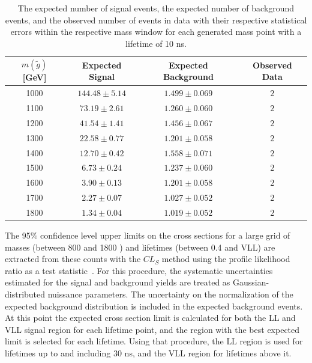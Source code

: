 \begin{table}[!htbp]
  \begin{center}
    \begin{tabular}{cccc}
      \hline
      $m(\tilde{g})$ [GeV]  & Expected Signal & Expected Background & Observed Data\\ 
      \hline
      1000    & $144.48 \pm 5.14 $ & $1.499 \pm 0.069 $ & $2$ \\
      1100    & $73.19 \pm 2.61 $  & $1.260 \pm 0.060 $ & $2$ \\
      1200    & $41.54 \pm 1.41 $  & $1.456 \pm 0.067 $ & $2$ \\
      1300    & $22.58 \pm 0.77 $  & $1.201 \pm 0.058 $ & $2$ \\
      1400    & $12.70 \pm 0.42 $  & $1.558 \pm 0.071 $ & $2$ \\
      1500    & $6.73 \pm 0.24 $   & $1.237 \pm 0.060 $ & $2$ \\
      1600    & $3.90 \pm 0.13 $   & $1.201 \pm 0.058 $ & $2$ \\
      1700    & $2.27 \pm 0.07 $   & $1.027 \pm 0.052 $ & $2$ \\
      1800    & $1.34 \pm 0.04 $   & $1.019 \pm 0.052 $ & $2$ \\
      \hline
    \end{tabular}
  \end{center}
  \caption{The expected number of signal events, the expected number of background events, and the observed number of events in data with their respective statistical errors within the respective mass window for each generated mass point with a lifetime of 10 ns.}
  \label{tab:counts_10ns}
\end{table}


The 95\% confidence level upper limits on the cross sections for a large grid of masses (between 800 and 1800 \GeV) and lifetimes (between 0.4 and \ac{VLL}) are extracted from these counts with the $CL_{S}$ method using the profile likelihood ratio as a test statistic~\cite{CLS_method}.
For this procedure, the systematic uncertainties estimated for the signal and background yields are treated as Gaussian-distributed nuissance parameters.
The uncertainty on the normalization of the expected background distribution is included in the expected background events.
At this point the expected cross section limit is calculated for both the \ac{LL} and \ac{VLL} signal region for each lifetime point, and the region with the best expected limit is selected for each lifetime.
Using that procedure, the \ac{LL} region is used for lifetimes up to and including 30 ns, and the \ac{VLL} region for lifetimes above it. 


